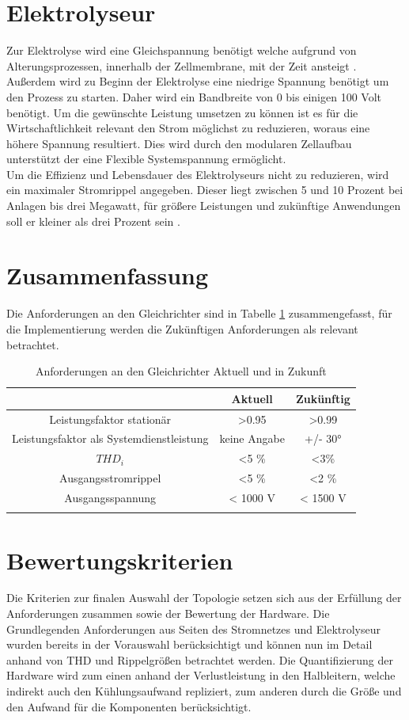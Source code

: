 \section{Elektrolyseur}
Zur Elektrolyse wird eine Gleichspannung benötigt welche aufgrund von Alterungsprozessen, innerhalb der Zellmembrane, mit der Zeit ansteigt \cite{HydrogenElectronicTopologies}. Außerdem wird zu Beginn der Elektrolyse eine niedrige Spannung benötigt um den Prozess zu starten. Daher wird ein Bandbreite von 0 bis einigen 100 Volt benötigt. Um die gewünschte Leistung umsetzen zu können ist es für die Wirtschaftlichkeit relevant den Strom möglichst zu reduzieren, woraus eine höhere Spannung resultiert. Dies wird durch den modularen Zellaufbau unterstützt der eine Flexible Systemspannung ermöglicht. \\
Um die Effizienz und Lebensdauer des Elektrolyseurs nicht zu reduzieren, wird ein maximaler Stromrippel angegeben. Dieser liegt zwischen 5 und 10 Prozent bei Anlagen bis drei Megawatt, für größere Leistungen und zukünftige Anwendungen soll er kleiner als drei Prozent sein \cite{HydrogenRectifier}.


\section{Zusammenfassung}
Die Anforderungen an den Gleichrichter sind in Tabelle \ref{tab:AnfZsm} zusammengefasst, für die Implementierung werden die Zukünftigen Anforderungen als relevant betrachtet.\\
\begin{table}
\caption{Anforderungen an den Gleichrichter Aktuell und in Zukunft}

\begin{tabular}{c|c|c}
	
	& Aktuell & Zukünftig \\
	\hline
	Leistungsfaktor stationär & >0.95 & >0.99 \\
	\hline
	Leistungsfaktor als Systemdienstleistung & keine Angabe & +/- 30° \\
	\hline
	$THD_{i}$ & <5 \% & <3\% \\
	\hline
	Ausgangsstromrippel & <5 \% & <2 \% \\
	\hline
	Ausgangsspannung & < 1000 V & < 1500 V \\
	
	
	\label{tab:AnfZsm}
\end{tabular}
\end{table}
\section{Bewertungskriterien}
Die Kriterien zur finalen Auswahl der Topologie setzen sich aus der Erfüllung der Anforderungen zusammen sowie der Bewertung der Hardware. Die Grundlegenden Anforderungen aus Seiten des Stromnetzes und Elektrolyseur wurden bereits in der Vorauswahl berücksichtigt und können nun im Detail anhand von \gls{THD} und Rippelgrößen betrachtet werden. Die Quantifizierung der Hardware wird zum einen anhand der Verlustleistung in den Halbleitern, welche indirekt auch den Kühlungsaufwand repliziert, zum anderen durch die Größe und den Aufwand für die Komponenten berücksichtigt.  